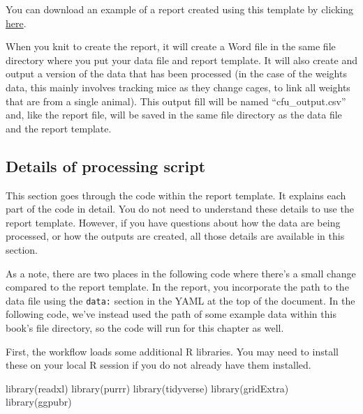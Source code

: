\documentclass[
]{book}
\newenvironment{Shaded}{\begin{snugshade}}{\end{snugshade}}
\newcommand{\FunctionTok}[1]{\textcolor[rgb]{0.00,0.00,0.00}{#1}}
\newcommand{\NormalTok}[1]{#1}
\begin{document}
You can download an example of a report created using this template by
clicking \href{https://github.com/csu-impactb/CODING-TEAM-BOOKDOWN-/raw/main/templates/report_templates/cfu_report.docx}{here}.

When you knit to create the report, it will create a Word file in the
same file directory where you put your data file and report template.
It will also create and output a version of the data that has been
processed (in the case of the weights data, this mainly involves
tracking mice as they change cages, to link all weights that are from
a single animal). This output fill will be named ``cfu\_output.csv'' and, like
the report file, will be saved in the same file directory as the
data file and the report template.

\hypertarget{details-of-processing-script-1}{%
\subsection{Details of processing script}\label{details-of-processing-script-1}}

This section goes through the code within the report template. It
explains each part of the code in detail. You do not need to understand
these details to use the report template. However, if you have questions
about how the data are being processed, or how the outputs are created,
all those details are available in this section.

As a note, there are two places in the following code where there's a small
change compared to the report template. In the report, you incorporate the path
to the data file using the \texttt{data:} section in the YAML at the top of the
document. In the following code, we've instead used the path of some example
data within this book's file directory, so the code will run for this chapter as
well.

First, the workflow loads some additional R libraries. You may need to install
these on your local R session if you do not already have them installed.

\begin{Shaded}
\begin{Highlighting}[]
\FunctionTok{library}\NormalTok{(readxl)}
\FunctionTok{library}\NormalTok{(purrr)}
\FunctionTok{library}\NormalTok{(tidyverse)}
\FunctionTok{library}\NormalTok{(gridExtra)}
\FunctionTok{library}\NormalTok{(ggpubr)}
\end{Highlighting}
\end{Shaded}
\end{document}
